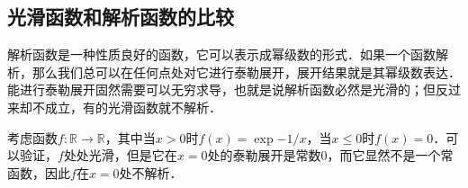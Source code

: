 \subsection{光滑函数和解析函数的比较}

解析函数是一种性质良好的函数，它可以表示成幂级数的形式．如果一个函数解析，那么我们总可以在任何点处对它进行泰勒展开，展开结果就是其幂级数表达．能进行泰勒展开固然需要可以无穷求导，也就是说解析函数必然是光滑的；但反过来却不成立，有的光滑函数就不解析．

\begin{exercise}{}
考虑函数$f:\mathbb{R}\rightarrow\mathbb{R}$，其中当$x>0$时$f(x)=\exp{-1/x}$，当$x\leq 0$时$f(x)=0$．可以验证，$f$处处光滑，但是它在$x=0$处的泰勒展开是常数$0$，而它显然不是一个常函数，因此$f$在$x=0$处不解析．
\end{exercise}



